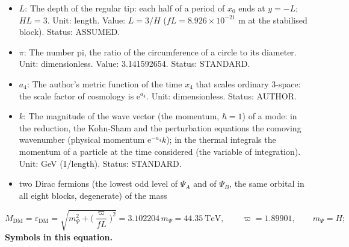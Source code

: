 \documentclass[
  10pt,
]{article}
\providecommand{\tightlist}{%
  \setlength{\itemsep}{0pt}\setlength{\parskip}{0pt}}
\begin{document}
\begin{itemize}
\item
  \(L\): The depth of the regular tip: each half of a period of \(x_0\)
  ends at \(y = -L\); \(HL = 3\). Unit: length. Value: \(L = 3/H\)
  (\(fL = 8.926\times10^{-21}\) m at the stabilised block). Status:
  ASSUMED.
\item
  \(\pi\): The number pi, the ratio of the circumference of a circle to
  its diameter. Unit: dimensionless. Value: 3.141592654. Status:
  STANDARD.
\item
  \(a_4\): The author's metric function of the time \(x_4\) that scales
  ordinary 3-space: the scale factor of cosmology is
  \(\mathrm{e}^{a_4}\). Unit: dimensionless. Status: AUTHOR.
\item
  \(k\): The magnitude of the wave vector (the momentum, \(\hbar = 1\))
  of a mode: in the reduction, the Kohn-Sham and the perturbation
  equations the comoving wavenumber (physical momentum
  \(\mathrm{e}^{-a_4}k\)); in the thermal integrals the momentum of a
  particle at the time considered (the variable of integration). Unit:
  GeV (1/length). Status: STANDARD.
\end{itemize}

\begin{itemize}
\tightlist
\item
  two Dirac fermions (the lowest odd level of \(\Psi_A\) and of
  \(\Psi_B\), the same orbital in all eight blocks, degenerate) of the
  mass
\end{itemize}

\[ M_{\mathrm{DM}} = \varepsilon_{\mathrm{DM}} = \sqrt{m_\Psi^2 + \Big(\frac{\varpi}{fL}\Big)^2} = 3.102204\,m_\Psi = 44.35\ \text{TeV},\qquad \varpi = 1.89901,\qquad m_\Psi = H; \]
\textbf{Symbols in this equation.}
\end{document}
